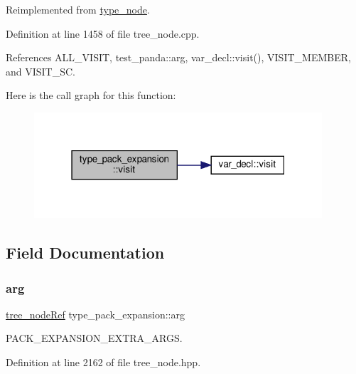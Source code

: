 Reimplemented from \hyperlink{structtype__node_adc6e447af5f9505e6305320933c46a96}{type\+\_\+node}.



Definition at line 1458 of file tree\+\_\+node.\+cpp.



References A\+L\+L\+\_\+\+V\+I\+S\+IT, test\+\_\+panda\+::arg, var\+\_\+decl\+::visit(), V\+I\+S\+I\+T\+\_\+\+M\+E\+M\+B\+ER, and V\+I\+S\+I\+T\+\_\+\+SC.

Here is the call graph for this function\+:
\nopagebreak
\begin{figure}[H]
\begin{center}
\leavevmode
\includegraphics[width=304pt]{de/dbe/structtype__pack__expansion_a29598e1fd00fefa43588b8b30c8a6675_cgraph}
\end{center}
\end{figure}


\subsection{Field Documentation}
\mbox{\label{structtype__pack__expansion_ae83ab534e3953eeaed0896e2b2c05aef}} 
\subsubsection{\texorpdfstring{arg}{arg}}
{\footnotesize\ttfamily \hyperlink{tree__node_8hpp_a6ee377554d1c4871ad66a337eaa67fd5}{tree\+\_\+node\+Ref} type\+\_\+pack\+\_\+expansion\+::arg}



P\+A\+C\+K\+\_\+\+E\+X\+P\+A\+N\+S\+I\+O\+N\+\_\+\+E\+X\+T\+R\+A\+\_\+\+A\+R\+GS. 



Definition at line 2162 of file tree\+\_\+node.\+hpp.



